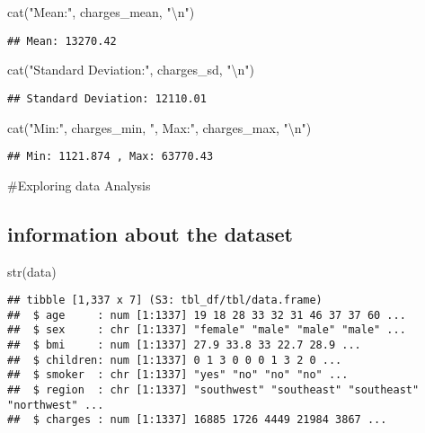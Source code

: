 \documentclass[
]{article}
\newenvironment{Shaded}{\begin{snugshade}}{\end{snugshade}}
\newcommand{\FunctionTok}[1]{\textcolor[rgb]{0.00,0.00,0.00}{#1}}
\newcommand{\NormalTok}[1]{#1}
\newcommand{\SpecialCharTok}[1]{\textcolor[rgb]{0.00,0.00,0.00}{#1}}
\newcommand{\StringTok}[1]{\textcolor[rgb]{0.31,0.60,0.02}{#1}}
\begin{document}
\begin{Shaded}
\begin{Highlighting}[]
\FunctionTok{cat}\NormalTok{(}\StringTok{"Mean:"}\NormalTok{, charges\_mean, }\StringTok{"}\SpecialCharTok{\textbackslash{}n}\StringTok{"}\NormalTok{)}
\end{Highlighting}
\end{Shaded}

\begin{verbatim}
## Mean: 13270.42
\end{verbatim}

\begin{Shaded}
\begin{Highlighting}[]
\FunctionTok{cat}\NormalTok{(}\StringTok{"Standard Deviation:"}\NormalTok{, charges\_sd, }\StringTok{"}\SpecialCharTok{\textbackslash{}n}\StringTok{"}\NormalTok{)}
\end{Highlighting}
\end{Shaded}

\begin{verbatim}
## Standard Deviation: 12110.01
\end{verbatim}

\begin{Shaded}
\begin{Highlighting}[]
\FunctionTok{cat}\NormalTok{(}\StringTok{"Min:"}\NormalTok{, charges\_min, }\StringTok{", Max:"}\NormalTok{, charges\_max, }\StringTok{"}\SpecialCharTok{\textbackslash{}n}\StringTok{"}\NormalTok{)}
\end{Highlighting}
\end{Shaded}

\begin{verbatim}
## Min: 1121.874 , Max: 63770.43
\end{verbatim}

\#Exploring data Analysis

\hypertarget{information-about-the-dataset}{%
\subsection{information about the
dataset}\label{information-about-the-dataset}}

\begin{Shaded}
\begin{Highlighting}[]
\FunctionTok{str}\NormalTok{(data)}
\end{Highlighting}
\end{Shaded}

\begin{verbatim}
## tibble [1,337 x 7] (S3: tbl_df/tbl/data.frame)
##  $ age     : num [1:1337] 19 18 28 33 32 31 46 37 37 60 ...
##  $ sex     : chr [1:1337] "female" "male" "male" "male" ...
##  $ bmi     : num [1:1337] 27.9 33.8 33 22.7 28.9 ...
##  $ children: num [1:1337] 0 1 3 0 0 0 1 3 2 0 ...
##  $ smoker  : chr [1:1337] "yes" "no" "no" "no" ...
##  $ region  : chr [1:1337] "southwest" "southeast" "southeast" "northwest" ...
##  $ charges : num [1:1337] 16885 1726 4449 21984 3867 ...
\end{verbatim}
\end{document}
